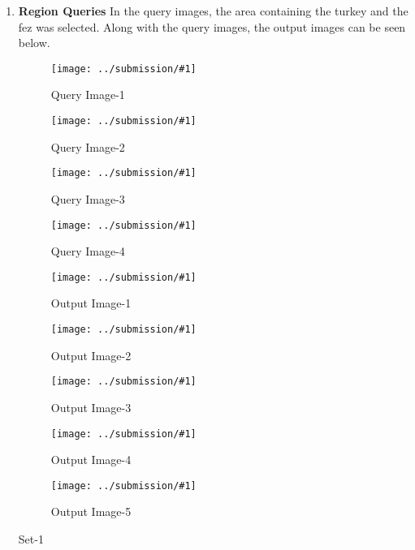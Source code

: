 \documentclass{article}
\newcommand{\listFigure}[3]{ \begin{figure}[H]
\texttt{[image: ../submission/\#1]}
		\caption{#2\label{fig:#3}}
	\end{figure}		
}
\begin{document}
\begin{enumerate}
		\newpage
	\item \textbf{Region Queries}
	In the query images, the area containing the turkey and the fez was selected.
	Along with the query images, the output images can be seen below.
	\listFigure{regionQueries-FOI-5.png}{Query Image-1}{RegionQueryInput-1}
	\listFigure{regionQueries-FOI-13.png}{Query Image-2}{RegionQueryInput-2}
	\listFigure{regionQueries-FOI-14.png}{Query Image-3}{RegionQueryInput-3}
	\listFigure{regionQueries-FOI-15.png}{Query Image-4}{RegionQueryInput-4}
	\listFigure{regionQueries-FOI-16.png}{Output Image-1}{RegionQueryInput-5}
	\listFigure{regionQueries-Sample-1.png}{Output Image-2}{RegionQueryOutput-5}
	\listFigure{regionQueries-Sample-2.png}{Output Image-3}{RegionQueryOutput-5}
	\listFigure{regionQueries-Sample-3.png}{Output Image-4}{RegionQueryOutput-5}
	\listFigure{regionQueries-Sample-4.png}{Output Image-5}{RegionQueryOutput-5} 
	Set-1 
\end{enumerate}
\end{document}
